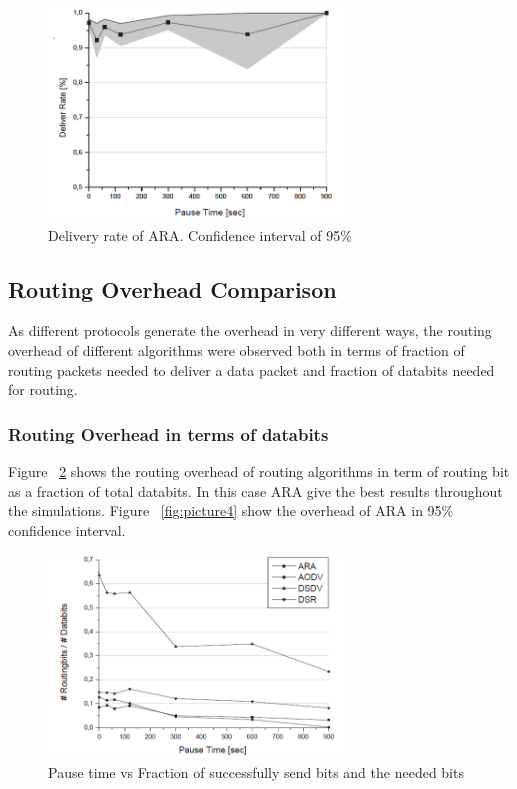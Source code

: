 \begin{figure}[t!]
\centering
\includegraphics[width=0.7\textwidth]{Picture2.png}
\caption{\label{fig:picture2}Delivery rate of ARA. Confidence interval of 95\%}
\end{figure}


\subsection{Routing Overhead Comparison}
As different protocols generate the overhead in very different ways, the routing overhead of different algorithms were observed both in terms of fraction of routing packets needed to deliver a data packet and fraction of databits needed for routing.
\subsubsection{Routing Overhead in terms of databits}
Figure ~\ref{fig:picture3} shows the routing overhead of routing algorithms in term of routing bit as a fraction of total databits. In this case ARA give the best results throughout the simulations. Figure ~\ref{fig:picture4} show the overhead of ARA in 95\% confidence interval.
  
\begin{figure}[t!]
\centering
\includegraphics[width=0.7\textwidth]{Picture3.png}
\caption{\label{fig:picture3}Pause time vs Fraction of successfully send bits and the needed bits}
\end{figure}

